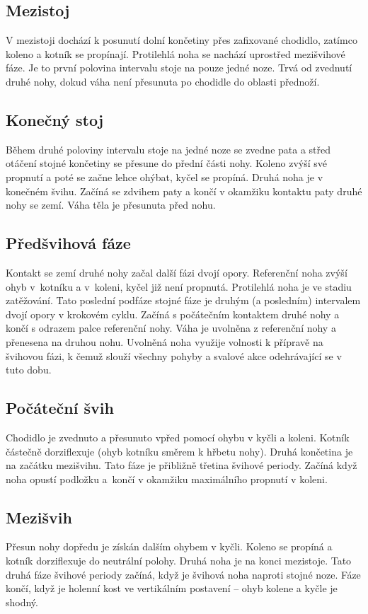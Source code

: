 \subsection{Mezistoj}
V mezistoji dochází k posunutí dolní končetiny přes zafixované chodidlo, zatímco koleno a kotník se propínají. Protilehlá noha se nachází uprostřed mezišvihové fáze. Je to první polovina intervalu stoje na pouze jedné noze. Trvá od zvednutí druhé nohy, dokud váha není přesunuta po chodidle do oblasti přednoží. 
\subsection{Konečný stoj}
Během druhé poloviny intervalu stoje na jedné noze se zvedne pata a střed otáčení stojné končetiny se přesune do přední části nohy. Koleno zvýší své propnutí a poté se začne lehce ohýbat, kyčel se propíná. Druhá noha je v konečném švihu. Začíná se zdvihem paty a končí v okamžiku kontaktu paty druhé nohy se zemí. Váha těla je přesunuta před nohu. 
\subsection{Předšvihová fáze}
Kontakt se zemí druhé nohy začal další fázi dvojí opory. Referenční noha zvýší ohyb v~kotníku a v~koleni, kyčel již není propnutá. Protilehlá noha je ve stadiu zatěžování. Tato poslední podfáze stojné fáze je druhým (a posledním) intervalem dvojí opory v krokovém cyklu. Začíná s počátečním kontaktem druhé nohy a končí s odrazem palce referenční nohy. Váha je uvolněna z referenční nohy a přenesena na druhou nohu. Uvolněná noha využije volnosti k přípravě na švihovou fázi, k čemuž slouží všechny pohyby a svalové akce odehrávající se v tuto dobu.
\subsection{Počáteční švih}
Chodidlo je zvednuto a přesunuto vpřed pomocí ohybu v kyčli a koleni. Kotník částečně dorziflexuje (ohyb kotníku směrem k hřbetu nohy). Druhá končetina je na začátku mezišvihu. Tato fáze je přibližně třetina švihové periody. Začíná když noha opustí podložku a~končí v okamžiku maximálního propnutí v koleni.
\subsection{Mezišvih}
Přesun nohy dopředu je získán dalším ohybem v kyčli. Koleno se propíná  a kotník dorziflexuje do neutrální polohy. Druhá noha je na konci mezistoje. Tato druhá fáze švihové periody začíná, když je švihová noha  naproti stojné noze. Fáze končí, když je holenní kost ve vertikálním postavení -- ohyb kolene a kyčle je shodný.
